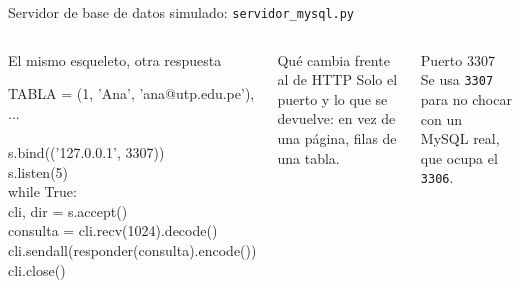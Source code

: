 \documentclass[aspectratio=169,10pt,c]{beamer}
\begin{document}
\begin{frame}{Servidor de base de datos simulado: \texttt{servidor\_mysql.py}}
\begin{columns}[T,onlytextwidth]
\begin{exampleblock}{El mismo esqueleto, otra respuesta}
\begin{terminal}\scriptsize
TABLA = \lbrack (1, 'Ana', 'ana@utp.edu.pe'), ... \rbrack\\
~\\
s.bind(('127.0.0.1', 3307))\\
s.listen(5)\\
while True:\\
\quad cli, dir = s.accept()\\
\quad consulta = cli.recv(1024).decode()\\
\quad cli.sendall(responder(consulta).encode())\\
\quad cli.close()
\end{terminal}
\end{exampleblock}
\begin{exampleblock}{Qué cambia frente al de HTTP}
\small Solo el puerto y lo que se devuelve: en vez de una página, filas de una tabla.
\end{exampleblock}
\begin{block}{Puerto 3307}
\small Se usa \texttt{3307} para no chocar con un MySQL real, que ocupa el \texttt{3306}.
\end{block}
\end{columns}
\end{frame}
\end{document}
